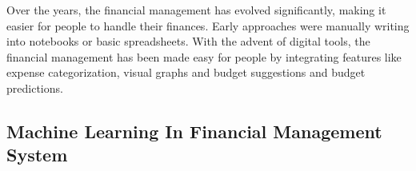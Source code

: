 \documentclass[12pt]{article}
\begin{document}
\noindent
\normalsize Over the years, the financial management has evolved significantly, making it easier for people to handle their finances. Early approaches were manually writing into notebooks or basic spreadsheets. With the advent of digital tools, the financial management has been made easy for people by integrating features like expense categorization, visual graphs and budget suggestions and budget predictions.\cite{cashflowforecasting}
\vspace{1 cm}
\begin{table}[h!]
    \centering
    \begin{center}
        \caption{Comparative Analysis}
    \end{center}
\end{table}

\vspace{1cm} %

\noindent
\subsection{Machine Learning In Financial Management System}
\end{document}
